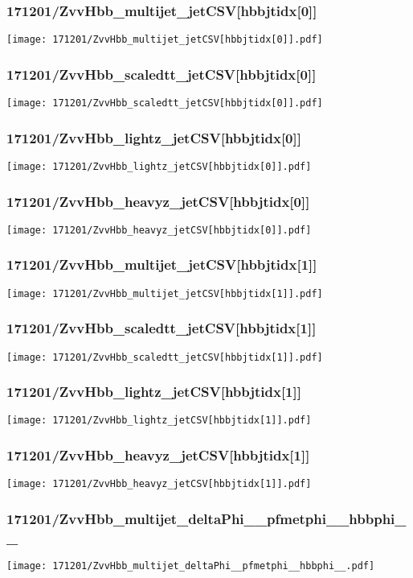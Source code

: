 \begin{frame}
   \frametitle{\small 171201/ZvvHbb\_multijet\_jetCSV[hbbjtidx[0]]}
   \centering
   \texttt{[image: 171201/ZvvHbb\_multijet\_jetCSV[hbbjtidx[0]].pdf]}
\end{frame}

\begin{frame}
   \frametitle{\small 171201/ZvvHbb\_scaledtt\_jetCSV[hbbjtidx[0]]}
   \centering
   \texttt{[image: 171201/ZvvHbb\_scaledtt\_jetCSV[hbbjtidx[0]].pdf]}
\end{frame}

\begin{frame}
   \frametitle{\small 171201/ZvvHbb\_lightz\_jetCSV[hbbjtidx[0]]}
   \centering
   \texttt{[image: 171201/ZvvHbb\_lightz\_jetCSV[hbbjtidx[0]].pdf]}
\end{frame}

\begin{frame}
   \frametitle{\small 171201/ZvvHbb\_heavyz\_jetCSV[hbbjtidx[0]]}
   \centering
   \texttt{[image: 171201/ZvvHbb\_heavyz\_jetCSV[hbbjtidx[0]].pdf]}
\end{frame}

\begin{frame}
   \frametitle{\small 171201/ZvvHbb\_multijet\_jetCSV[hbbjtidx[1]]}
   \centering
   \texttt{[image: 171201/ZvvHbb\_multijet\_jetCSV[hbbjtidx[1]].pdf]}
\end{frame}

\begin{frame}
   \frametitle{\small 171201/ZvvHbb\_scaledtt\_jetCSV[hbbjtidx[1]]}
   \centering
   \texttt{[image: 171201/ZvvHbb\_scaledtt\_jetCSV[hbbjtidx[1]].pdf]}
\end{frame}

\begin{frame}
   \frametitle{\small 171201/ZvvHbb\_lightz\_jetCSV[hbbjtidx[1]]}
   \centering
   \texttt{[image: 171201/ZvvHbb\_lightz\_jetCSV[hbbjtidx[1]].pdf]}
\end{frame}

\begin{frame}
   \frametitle{\small 171201/ZvvHbb\_heavyz\_jetCSV[hbbjtidx[1]]}
   \centering
   \texttt{[image: 171201/ZvvHbb\_heavyz\_jetCSV[hbbjtidx[1]].pdf]}
\end{frame}

\begin{frame}
   \frametitle{\small 171201/ZvvHbb\_multijet\_deltaPhi\_\_pfmetphi\_\_hbbphi\_\_}
   \centering
   \texttt{[image: 171201/ZvvHbb\_multijet\_deltaPhi\_\_pfmetphi\_\_hbbphi\_\_.pdf]}
\end{frame}

